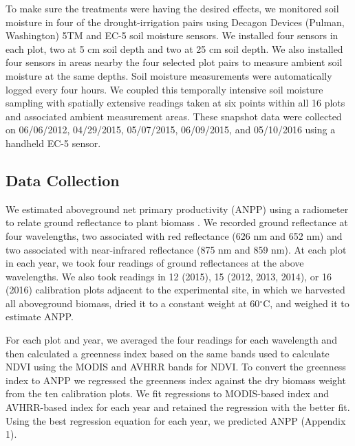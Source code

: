 \documentclass[fleqn,10pt,lineno]{wlpeerj} %
\begin{document}
To make sure the treatments were having the desired effects, we
monitored soil moisture in four of the drought-irrigation pairs using
Decagon Devices (Pulman, Washington) 5TM and EC-5 soil moisture sensors.
We installed four sensors in each plot, two at 5 cm soil depth and two
at 25 cm soil depth. We also installed four sensors in areas nearby the
four selected plot pairs to measure ambient soil moisture at the same
depths. Soil moisture measurements were automatically logged every four
hours. We coupled this temporally intensive soil moisture sampling with
spatially extensive readings taken at six points within all 16 plots and
associated ambient measurement areas. These snapshot data were collected
on 06/06/2012, 04/29/2015, 05/07/2015, 06/09/2015, and 05/10/2016 using
a handheld EC-5 sensor.


\subsection{Data Collection}\label{data-collection}

We estimated aboveground net primary productivity (ANPP) using a
radiometer to relate ground reflectance to plant biomass \citep[see][
for a review]{Byrne2011}. We recorded ground reflectance at four
wavelengths, two associated with red reflectance (626 nm and 652 nm) and
two associated with near-infrared reflectance (875 nm and 859 nm). At
each plot in each year, we took four readings of ground reflectances at
the above wavelengths. We also took readings in 12 (2015), 15 (2012,
2013, 2014), or 16 (2016) calibration plots adjacent to the experimental
site, in which we harvested all aboveground biomass, dried it to a
constant weight at 60\(^{\circ}\)C, and weighed it to estimate ANPP.

For each plot and year, we averaged the four readings for each
wavelength and then calculated a greenness index based on the same bands
used to calculate NDVI using the MODIS and AVHRR bands for NDVI. To
convert the greenness index to ANPP we regressed the greenness index
against the dry biomass weight from the ten calibration plots. We fit
regressions to MODIS-based index and AVHRR-based index for each year and
retained the regression with the better fit. Using the best regression
equation for each year, we predicted ANPP (Appendix 1).
\end{document}
